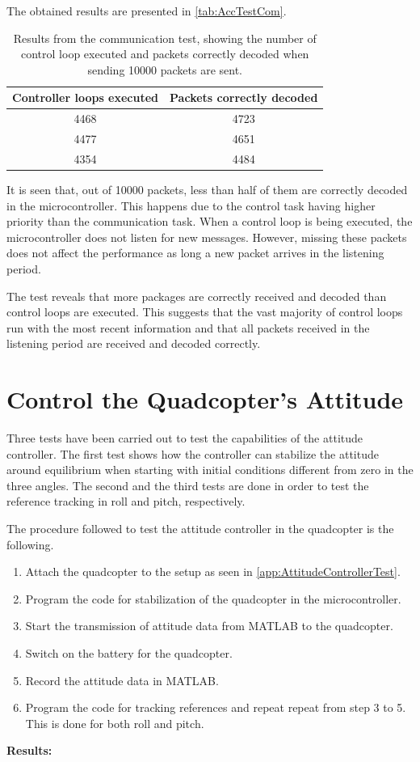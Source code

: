 The obtained results are presented in \autoref{tab:AccTestCom}.
\begin{table}[H]
    \centering
    \begin{tabular}{|c|c|}
        \hline
       Controller loops executed  & Packets correctly decoded \\ \hline
       4468 &  4723\\ \hline
       4477 &  4651\\ \hline
       4354 &  4484\\ \hline
    \end{tabular}
    \caption{Results from the communication test, showing the number of control loop executed and packets correctly decoded when sending 10000 packets are sent.}
        \label{tab:AccTestCom}
\end{table}
It is seen that, out of 10000 packets, less than half of them are correctly decoded in the microcontroller. This happens due to the control task having higher priority than the communication task. When a control loop is being executed, the microcontroller does not listen for new messages. However, missing these packets does not affect the performance as long a new packet arrives in the listening period.

The test reveals that more packages are correctly received and decoded than control loops are executed. This suggests that the vast majority of control loops run with the most recent information and that all packets received in the listening period are received and decoded correctly. 
\section{Control the Quadcopter's Attitude} \label{sec:accepttestAttitude}
Three tests have been carried out to test the capabilities of the attitude controller. The first test shows how the controller can stabilize the attitude around equilibrium when starting with initial conditions different from zero in the three angles. The second and the third tests are done in order to test the reference tracking in roll and pitch, respectively.

The procedure followed to test the attitude controller in the quadcopter is the following.
\begin{enumerate}
	\item Attach the quadcopter to the setup as seen in \autoref{app:AttitudeControllerTest}.
    \item Program the code for stabilization of the quadcopter in the microcontroller.
	\item Start the transmission of attitude data from MATLAB to the quadcopter.
	\item Switch on the battery for the quadcopter.
	\item Record the attitude data in MATLAB.
    \item Program the code for tracking references and repeat repeat from step 3 to 5. This is done for both roll and pitch.
\end{enumerate}
\textbf{Results:}

